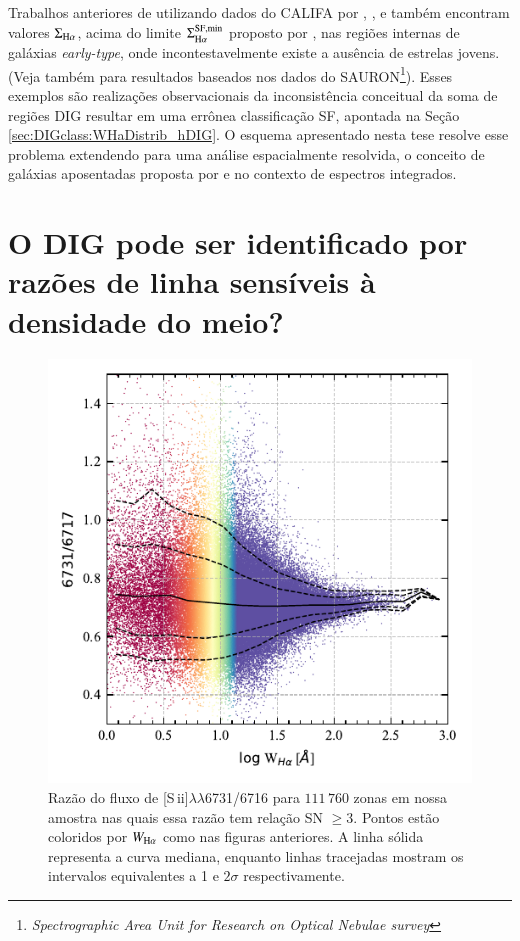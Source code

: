 Trabalhos anteriores de utilizando dados do CALIFA por \citet{Kehrig.etal.2012}, \citet{Singh.etal.2013}, e \citet{Gomes.etal.2016b} também encontram valores $\Sigma_{\Ha}$, acima do limite $\Sigma^{\rm SF,min}_{\Ha}$ proposto por \citet{Zhang.etal.2017a}, nas regiões internas de galáxias {\em early-type}, onde incontestavelmente existe a ausência de estrelas jovens. (Veja também \citealt{Sarzi.etal.2010} para resultados baseados nos dados do SAURON\footnote{\em Spectrographic Area Unit for Research on Optical Nebulae survey}). Esses exemplos são realizações observacionais da inconsistência conceitual da soma de regiões DIG resultar em uma errônea classificação SF, apontada na Seção \ref{sec:DIGclass:WHaDistrib_hDIG}. O esquema apresentado nesta tese resolve esse problema extendendo para uma análise espacialmente resolvida, o conceito de galáxias aposentadas proposta por \citet{Stasinska.etal.2008a} e \citet{CidFernandes.etal.2011a} no contexto de espectros integrados.


\section{O DIG pode ser identificado por razões de linha sensíveis à densidade do meio?}
\label{sec:DIGdisc:nSii}

\begin{figure}
 \includegraphics{figuras/fig_SII_logWHa_SNR3.pdf}
 \caption{Razão do fluxo de [S\,{\sc ii}]$\lambda\lambda$6731/6716 para $111\,760$ zonas em nossa amostra nas quais essa razão tem relação SN $\ge 3$. Pontos estão coloridos por $W_{\Ha}$ como nas figuras anteriores. A linha sólida representa a curva mediana, enquanto linhas tracejadas mostram os intervalos equivalentes a 1 e $2\sigma$ respectivamente.}
 \label{fig:S2_WHa}
\end{figure}

